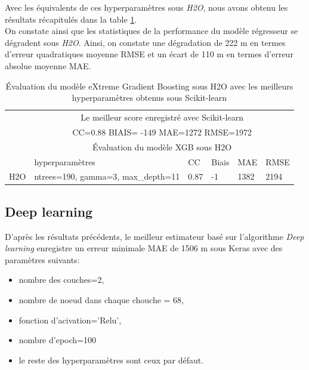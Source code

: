 Avec les équivalents de ces hyperparamètres sous \textit{H2O}, nous avons obtenu les résultats récapitulés dans la table \ref{tab:xgb_croisé}.\\ 

 On constate ainsi que les statistiques de la performance du modèle régresseur se dégradent sous \textit{H2O}. Ainsi, on constate une dégradation de 222 m en termes d'erreur quadratiques moyenne RMSE et un écart de 110 m en termes d'erreur absolue moyenne MAE.\\

\begin{table}[ht]
    \centering
    \begin{tabular}{ |p{1.6cm}|p{4cm}|p{1.6cm}|p{1.6cm}|p{1.6cm}|p{1.6cm}|  }
     \hline
     & \multicolumn{5}{c|}{Le meilleur score enregistré avec Scikit-learn} \\
     &\multicolumn{5}{c|}{CC=0.88 \hspace{0.2cm} BIAIS= -149 \hspace{0.2cm} MAE=1272 \hspace{0.2cm} RMSE=1972}\\
     \hline
     & \multicolumn{5}{|c|}{Évaluation du modèle XGB sous H2O} \\
     \hline
     & hyperparamètres & CC & Biais & MAE & RMSE\\
     \hline
     H2O & ntrees=190, gamma=3, max\_depth=11 & 0.87 & -1 & 1382 & 2194 \\
     \hline
    \end{tabular}
    \caption{Évaluation du modèle eXtreme Gradient Boosting sous H2O  avec les meilleurs hyperparamètres obtenus sous Scikit-learn}
    \label{tab:xgb_croisé}
\end{table}

\subsection*{Deep learning}
D'après les résultats précédents, le meilleur estimateur basé sur l'algorithme \textit{Deep learning} enregistre un erreur minimale MAE de 1506 m sous Keras avec des paramètres suivants:

\begin{itemize}
    \item[\ding{223}] nombre des couches=2,
    \item[\ding{223}] nombre de noeud dans chaque chouche = 68,
    \item[\ding{223}] fonction d'acivation='Relu',
    \item[\ding{223}] nombre d'epoch=100
    \item[\ding{223}] le reste des hyperparamètres sont ceux par défaut.\\
\end{itemize}

